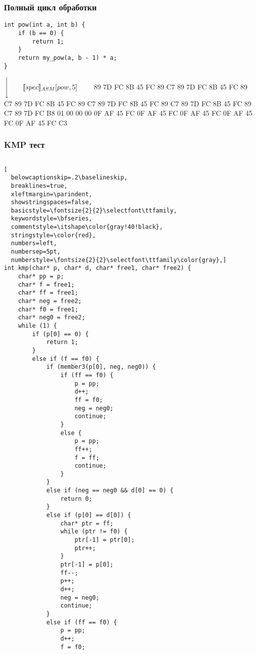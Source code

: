 \documentclass[demo]{beamer}
\begin{document}
\lstset{language=C}
\begin{frame}[fragile]\frametitle{Полный цикл обработки}
\begin{lstlisting}
int pow(int a, int b) {
    if (b == 0) {
        return 1;
    }
    return my_pow(a, b - 1) * a;
}
\end{lstlisting}
\vfill
$\Bigg\downarrow{\qquad \llbracket spec \rrbracket_{ASM}[pow, 5] \qquad}$
\vfill
\tiny 89 7D FC 8B 45 FC 89 C7 89 7D FC 8B 45 FC 89 C7 89 7D FC 8B 45 FC 89 C7 89 7D FC 8B 45 FC 89 C7 89 7D FC 8B 45 FC 89 C7 89 7D FC B8 01 00 00 00 0F AF 45 FC 0F AF 45 FC 0F AF 45 FC 0F AF 45 FC 0F AF 45 FC C3
\end{frame}

\lstset{language=C}
\begin{frame}[fragile]\frametitle{KMP тест}
\begin{columns}
\begin{column}{0.2\textwidth}
\begin{lstlisting}[
  belowcaptionskip=.2\baselineskip,
  breaklines=true,
  xleftmargin=\parindent,
  showstringspaces=false,
  basicstyle=\fontsize{2}{2}\selectfont\ttfamily,
  keywordstyle=\bfseries,
  commentstyle=\itshape\color{gray!40!black},
  stringstyle=\color{red},
  numbers=left,
  numbersep=5pt,
  numberstyle=\fontsize{2}{2}\selectfont\ttfamily\color{gray},]
int kmp(char* p, char* d, char* free1, char* free2) {
    char* pp = p;
    char* f = free1;
    char* ff = free1;
    char* neg = free2;
    char* f0 = free1;
    char* neg0 = free2;
    while (1) {
        if (p[0] == 0) {
            return 1;
        }
        else if (f == f0) {
            if (member3(p[0], neg, neg0)) {
                if (ff == f0) {
                    p = pp;
                    d++;
                    ff = f0;
                    neg = neg0;
                    continue;
                }
                else {
                    p = pp;
                    ff++;
                    f = ff;
                    continue;
                }
            }
            else if (neg == neg0 && d[0] == 0) {
                return 0;
            }
            else if (p[0] == d[0]) {
                char* ptr = ff;
                while (ptr != f0) {
                    ptr[-1] = ptr[0];
                    ptr++;
                }
                ptr[-1] = p[0];
                ff--;
                p++;
                d++;
                neg = neg0;
                continue;
            }
            else if (ff == f0) {
                p = pp;
                d++;
                f = f0;

\end{lstlisting}
\end{column}
\end{columns}
\end{frame}
\end{document}
